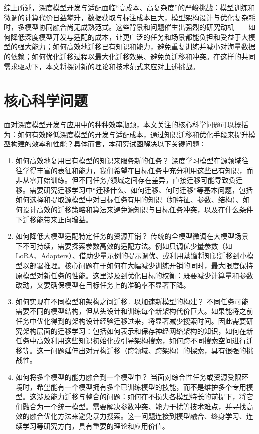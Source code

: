 \documentclass[../main.tex]{subfiles}
\begin{document}
综上所述，深度模型开发与适配面临“高成本、高复杂度”的严峻挑战：模型训练和微调的计算代价日益攀升，数据获取与标注成本巨大，模型架构设计与优化复杂耗时，多模型协同融合尚无成熟范式。这些背景和问题催生出强烈的研究动机——如何降低深度模型开发与适配的成本，让更广泛的任务和场景都能负担和受益于大模型的强大能力；如何高效地迁移已有知识和能力，避免重复训练并减小对海量数据的依赖；如何优化迁移过程以最大化迁移效果、避免负迁移和冲突。在这样的共同需求驱动下，本文将探讨新的理论和技术范式来应对上述挑战。

\section[\hspace{-2pt}核心科学问题]{{\heiti{} \hspace{-8pt}核心科学问题}}\label{sec:core-scientific-issues}

面对深度模型开发与应用中的种种效率瓶颈，本文关注的核心科学问题可以概括为：如何有效降低深度模型的开发与适配成本，通过知识迁移和优化手段来提升模型构建的效率和性能？具体而言，本研究试图解决以下关键问题：

\begin{enumerate}
  \item 如何高效地复用已有模型的知识来服务新的任务？ 深度学习模型在源领域往往学得丰富的表征和能力，我们希望在目标任务中充分利用这些已有知识，而非从零开始训练。但不同任务/领域之间存在差异，直接迁移可能导致负迁移。需要研究迁移学习中“迁移什么、如何迁移、何时迁移”等基本问题，包括如何选择和提取源模型中对目标任务有用的知识（如特征、参数、结构）、如何设计高效的迁移策略和算法来避免源知识与目标任务冲突，以及在什么条件下迁移能带来正向增益。
  \item 如何降低大模型适配特定任务的资源开销？ 传统的全模型微调在大模型场景下不可持续，需要探索参数高效的适配方法。例如只调优少量参数（如LoRA、Adapters）、借助少量示例的提示调优、或利用蒸馏将知识迁移到小模型以部署推理。核心问题在于如何在大幅减少训练开销的同时，最大限度保持原模型对新任务的性能。这里涉及到优化目标的权衡：既要减少计算量和参数改动，又要确保模型在目标任务上的准确率不显著下降。
  \item 如何实现在不同模型和架构之间迁移，以加速新模型的构建？ 不同任务可能需要不同的模型结构，但从头设计和训练每个新架构代价巨大。如果能将之前任务中优化得到的架构设计经验迁移过来，将显著减少搜索时间。因此需要研究架构层面的迁移学习：包括如何表示和保存神经网络架构的知识，如何在新任务中高效利用这些知识初始化或引导架构搜索，如何跨不同搜索空间进行迁移等。这一问题延伸出对异构迁移（跨领域、跨架构）的探索，具有很强的挑战性。
  \item 如何将多个模型的能力融合到一个模型中？ 当面对综合性任务或资源受限环境时，希望能有一个模型拥有多个已训练模型的技能，而不是维护多个专用模型。这涉及能力迁移与整合的问题：如何在不损失各模型特长的前提下，将它们融合为一个统一模型。需要解决参数冲突、能力干扰等技术难点，并寻找高效的融合优化方法来避免暴力搜索。这一问题连接到模型融合、终身学习、连续学习等研究方向，具有重要的理论和应用价值。
\end{enumerate}
\end{document}
